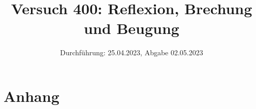 

\title{Versuch 400:  Reflexion, Brechung und Beugung}
\date{Durchführung: 25.04.2023, Abgabe 02.05.2023}


\maketitle
\thispagestyle{empty} 
\tableofcontents
\newpage
\setcounter{page}{1}






\printbibliography
\newpage

\section*{Anhang}


